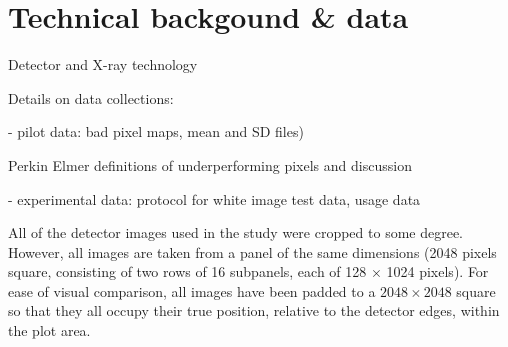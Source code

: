 \documentclass[../../IO-Pixels.tex]{subfiles}
\begin{document}
\section{Technical backgound \& data}
\begin{outline}
Detector and X-ray technology

Details on data collections: 

- pilot data: bad pixel maps, mean and SD files)

  Perkin Elmer definitions of underperforming pixels and discussion
  
- experimental data: protocol for white image test data, usage data
\end{outline}

All of the detector images used in the study were cropped to some degree. However, all images are taken from a panel of the same dimensions (2048 pixels square, consisting of two rows of 16 subpanels, each of 128 $\times$ 1024 pixels). For ease of visual comparison, all images have been padded to a $2048 \times 2048$ square so that they all occupy their true position, relative to the detector edges, within the plot area.
  
\end{document}
